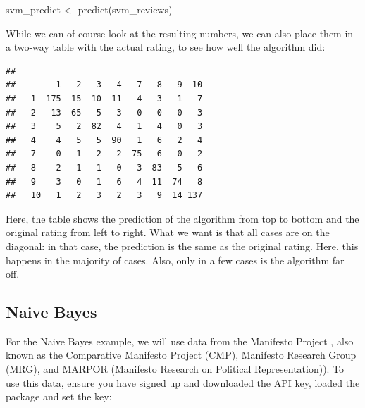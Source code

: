 \documentclass[
]{article}
\newenvironment{Shaded}{\begin{snugshade}}{\end{snugshade}}
\newcommand{\FunctionTok}[1]{\textcolor[rgb]{0.00,0.00,0.00}{#1}}
\newcommand{\NormalTok}[1]{#1}
\newcommand{\OtherTok}[1]{\textcolor[rgb]{0.56,0.35,0.01}{#1}}
\newcommand{\SpecialCharTok}[1]{\textcolor[rgb]{0.00,0.00,0.00}{#1}}
\begin{document}
\begin{Shaded}
\begin{Highlighting}[]
\NormalTok{svm\_predict }\OtherTok{\textless{}{-}} \FunctionTok{predict}\NormalTok{(svm\_reviews)}
\end{Highlighting}
\end{Shaded}

While we can of course look at the resulting numbers, we can also place them in a two-way table with the actual rating, to see how well the algorithm did:

\begin{Shaded}
\end{Shaded}

\begin{verbatim}
##     
##        1   2   3   4   7   8   9  10
##   1  175  15  10  11   4   3   1   7
##   2   13  65   5   3   0   0   0   3
##   3    5   2  82   4   1   4   0   3
##   4    4   5   5  90   1   6   2   4
##   7    0   1   2   2  75   6   0   2
##   8    2   1   1   0   3  83   5   6
##   9    3   0   1   6   4  11  74   8
##   10   1   2   3   2   3   9  14 137
\end{verbatim}

Here, the table shows the prediction of the algorithm from top to bottom and the original rating from left to right. What we want is that all cases are on the diagonal: in that case, the prediction is the same as the original rating. Here, this happens in the majority of cases. Also, only in a few cases is the algorithm far off.

\hypertarget{naive-bayes}{%
\subsection{Naive Bayes}\label{naive-bayes}}

For the Naive Bayes example, we will use data from the Manifesto Project \autocite{Volkens2019a}, also known as the Comparative Manifesto Project (CMP), Manifesto Research Group (MRG), and MARPOR (Manifesto Research on Political Representation)). To use this data, ensure you have signed up and downloaded the API key, loaded the package and set the key:
\end{document}
